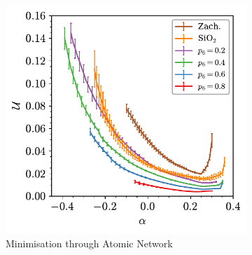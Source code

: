 
\begin{figure}[bt]
     \centering
     
     \begin{subfigure}[b]{0.45\textwidth}
         \centering
         \includegraphics[width=\textwidth]{./figures/targeted_opt/topt_u_graph.pdf}
         \caption{Minimisation through Atomic Network}
         \label{fig:toptenergy1}
     \end{subfigure}
     \hfill
	\begin{subfigure}[b]{0.45\textwidth}
         \centering

\end{subfigure}
\end{figure}
